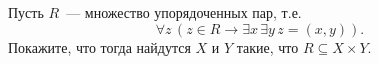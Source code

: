 Пусть $R$~--- множество упорядоченных пар, т.е.
$$
    \forall z\, (z \in R \rightarrow \exists x\, \exists y\, z = (x, y)).
$$
Покажите, что тогда найдутся $X$ и $Y$ такие, что $R \subseteq X \times Y$.
